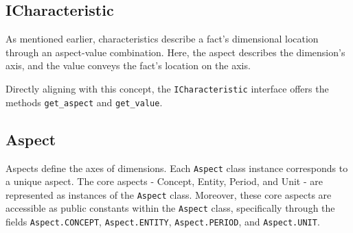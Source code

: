 \subsection{ICharacteristic}

As mentioned earlier, characteristics describe a fact's dimensional location through an aspect-value combination.
Here, the aspect describes the dimension's axis, and the value conveys the fact's location on the axis.

Directly aligning with this concept, 
the \texttt{ICharacteristic} interface offers the methods \texttt{get\_aspect} and \texttt{get\_value}.

\subsection{Aspect}



Aspects define the axes of dimensions.
Each \texttt{Aspect} class instance corresponds to a unique aspect.
The core aspects - Concept, Entity, Period, and Unit - are represented as instances of the \texttt{Aspect} class.
Moreover, these core aspects are accessible as public constants within the \texttt{Aspect} class,
specifically through the fields \texttt{Aspect.CONCEPT}, \texttt{Aspect.ENTITY}, \texttt{Aspect.PERIOD}, and \texttt{Aspect.UNIT}.

